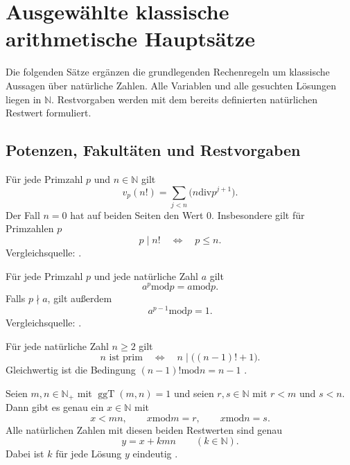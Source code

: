 \chapter{Ausgewählte klassische arithmetische Hauptsätze}
\label{b10guide:ch:classical}

Die folgenden Sätze ergänzen die grundlegenden Rechenregeln um
klassische Aussagen über natürliche Zahlen. Alle Variablen und
alle gesuchten Lösungen liegen in $\mathbb N$. Restvorgaben werden
mit dem bereits definierten natürlichen Restwert formuliert.

\section{Potenzen, Fakultäten und Restvorgaben}

\begin{theorem}
\label{b10guide:thm:legendre}
Für jede Primzahl $p$ und $n\in\mathbb N$ gilt
\[
 v_p(n!)=\sum_{j<n}
       \bigl(n\mathbin{\mathrm{div}}p^{j+1}\bigr).
\]
Der Fall $n=0$ hat auf beiden Seiten den Wert $0$.
Insbesondere gilt für Primzahlen $p$
\[
 p\mid n!\quad\Longleftrightarrow\quad p\le n.
\]
Vergleichsquelle: \cite{natlegendre}.
\end{theorem}

\begin{theorem}
\label{b10guide:thm:fermat-little}
Für jede Primzahl $p$ und jede natürliche Zahl $a$ gilt
\[
 a^p\mathbin{\mathrm{mod}}p=a\mathbin{\mathrm{mod}}p.
\]
Falls $p\nmid a$, gilt außerdem
\[
 a^{p-1}\mathbin{\mathrm{mod}}p=1.
\]
Vergleichsquelle: \cite{natfermat}.
\end{theorem}

\begin{theorem}
\label{b10guide:thm:wilson}
Für jede natürliche Zahl $n\ge2$ gilt
\[
 n\text{ ist prim}\quad\Longleftrightarrow\quad
 n\mid\bigl((n-1)!+1\bigr).
\]
Gleichwertig ist die Bedingung
$(n-1)!\mathbin{\mathrm{mod}}n=n-1$ \cite{natwilson}.
\end{theorem}

\begin{theorem}
\label{b10guide:thm:chinese-remainder}
Seien $m,n\in\mathbb N_+$ mit $\operatorname{ggT}(m,n)=1$
und seien $r,s\in\mathbb N$ mit $r<m$ und $s<n$.
Dann gibt es genau ein $x\in\mathbb N$ mit
\[
 x<mn,\qquad x\mathbin{\mathrm{mod}}m=r,\qquad
 x\mathbin{\mathrm{mod}}n=s.
\]
Alle natürlichen Zahlen mit diesen beiden Restwerten sind genau
\[
 y=x+kmn\qquad(k\in\mathbb N).
\]
Dabei ist $k$ für jede Lösung $y$ eindeutig \cite{natchinese}.
\end{theorem}


